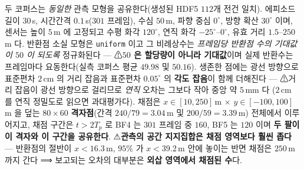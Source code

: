 \documentclass[11pt]{report}
\numberwithin{equation}{chapter}
\numberwithin{figure}{chapter}
\numberwithin{table}{chapter}
\begin{document}
두 코퍼스는 \emph{동일한} 관측 모형을 공유한다(생성된 HDF5 $112$개 전건 일치).
에피소드 길이 $30$\,s, 시간간격 $0.1$\,s($301$ 프레임), 수심 $50$\,m, 파향 중심 $0^\circ$,
방향 확산 $30^\circ$ 이며, 센서는 높이 $5$\,m 에 고정되고 수평 화각 $120^\circ$,
연직 화각 $-25^\circ$--$0^\circ$, 유효 거리 $1.5$--$250$\,m 다. 반환점 소실 모형은
\texttt{uniform} 이고 그 비례상수는 \emph{프레임당 반환점 수의 기대값이 $50$ 이 되도록}
정규화된다 --- ⚠\textbf{$50$ 은 할당량이 아니라 기대값}이며 실제 반환수는 프레임마다
요동한다(실측 코퍼스 평균 $49.98$ 및 $50.16$). 생존한 점에는 광선 방향으로 표준편차
$2$\,cm 의 거리 잡음과 표준편차 $0.05^\circ$ 의 \textbf{각도 잡음}이 함께 더해진다 ---
⚠거리 잡음이 광선 방향으로 걸리므로 \emph{연직} 오차는 그보다 작아 중앙 약 $5$\,mm 다
($2$\,cm 를 연직 정밀도로 읽으면 과대평가다).
채점은 $x\in[10,250]$\,m $\times$ $y\in[-100,100]$\,m 을 덮는
$80\times60$ \textbf{격자점}(간격 $240/79 = 3.04$\,m 및 $200/59 = 3.39$\,m) 전체에서 이루어지고,
채점 구간은 $t > 2T_p$ 로 BF4 는 $301$ 프레임 중 $160$, BF5 는 $120$ 이며
\textbf{두 팔이 이 격자와 이 구간을 공유한다}.
⚠\textbf{관측의 공간 지지집합은 채점 영역보다 훨씬 좁다} --- 반환점의 절반이 $x<16.3$\,m,
$95\%$ 가 $x<39.2$\,m 안에 놓이는 반면 채점은 $250$\,m 까지 간다 ⟹ 보고되는 오차의 대부분은
\textbf{외삽 영역에서 채점된 수}다.
\end{document}
